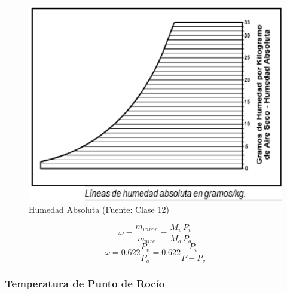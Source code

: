         \begin{multicols}{2}
            \begin{figure}
                \includegraphics[width=\textwidth]{img/clases/humedad_absoluta.png}
                \caption{Humedad Absoluta (Fuente: Clase 12)}
                \label{fig:humedad_absoluta}
            \end{figure}
            
            \begin{quote}
            \end{quote}
            
            \[\omega = \frac{m_{vapor}}{m_{aire}}=\frac{M_{v}}{M_{a}}\frac{P_{v}}{P_{a}}\]
            \[\omega = 0.622\frac{P_{v}}{P_{a}} = 0.622\frac{P_{v}}{P - P_{v}}\]
        \end{multicols}
        
        \subsubsection{Temperatura de Punto de Rocío}
        
